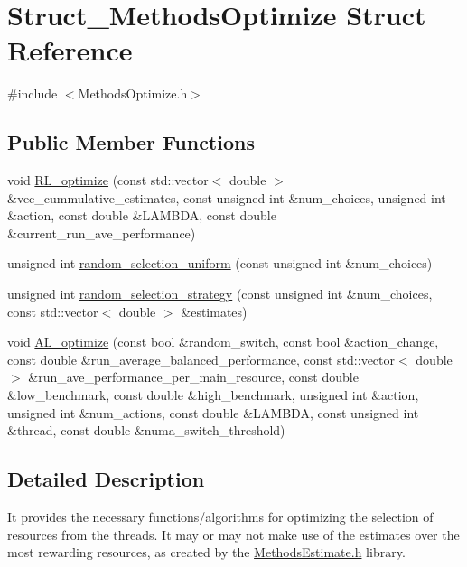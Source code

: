 \hypertarget{structStruct__MethodsOptimize}{\section{Struct\-\_\-\-Methods\-Optimize Struct Reference}
\label{structStruct__MethodsOptimize}
}


{\ttfamily \#include $<$Methods\-Optimize.\-h$>$}

\subsection*{Public Member Functions}
\begin{DoxyCompactItemize}
\item 
void \hyperlink{structStruct__MethodsOptimize_aae92e8b55e02d8f476c70fd84a817b2d}{R\-L\-\_\-optimize} (const std\-::vector$<$ double $>$ \&vec\-\_\-cummulative\-\_\-estimates, const unsigned int \&num\-\_\-choices, unsigned int \&action, const double \&L\-A\-M\-B\-D\-A, const double \&current\-\_\-run\-\_\-ave\-\_\-performance)
\item 
unsigned int \hyperlink{structStruct__MethodsOptimize_a02f7220d538eae22064174816dd73bf6}{random\-\_\-selection\-\_\-uniform} (const unsigned int \&num\-\_\-choices)
\item 
unsigned int \hyperlink{structStruct__MethodsOptimize_af46b3c9b62e65360adb3ac65d7ecd8d3}{random\-\_\-selection\-\_\-strategy} (const unsigned int \&num\-\_\-choices, const std\-::vector$<$ double $>$ \&estimates)
\item 
void \hyperlink{structStruct__MethodsOptimize_aec0f2037974da6b68e4e0fa7f84b8fa8}{A\-L\-\_\-optimize} (const bool \&random\-\_\-switch, const bool \&action\-\_\-change, const double \&run\-\_\-average\-\_\-balanced\-\_\-performance, const std\-::vector$<$ double $>$ \&run\-\_\-ave\-\_\-performance\-\_\-per\-\_\-main\-\_\-resource, const double \&low\-\_\-benchmark, const double \&high\-\_\-benchmark, unsigned int \&action, unsigned int \&num\-\_\-actions, const double \&L\-A\-M\-B\-D\-A, const unsigned int \&thread, const double \&numa\-\_\-switch\-\_\-threshold)
\end{DoxyCompactItemize}


\subsection{Detailed Description}
It provides the necessary functions/algorithms for optimizing the selection of resources from the threads. It may or may not make use of the estimates over the most rewarding resources, as created by the \hyperlink{MethodsEstimate_8h_source}{Methods\-Estimate.\-h} library. 

